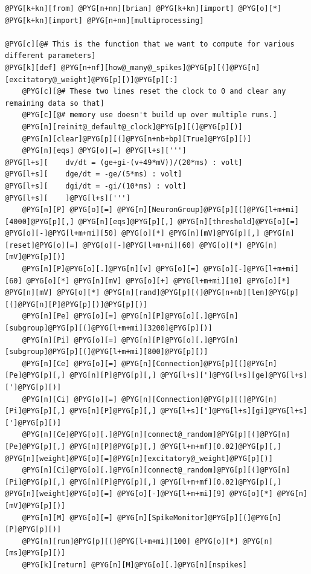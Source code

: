 \documentclass[letterpaper,10pt,english]{manual}
\begin{document}
\begin{Verbatim}[commandchars=@\[\]]
@PYG[k+kn][from] @PYG[n+nn][brian] @PYG[k+kn][import] @PYG[o][*]
@PYG[k+kn][import] @PYG[n+nn][multiprocessing]

@PYG[c][@# This is the function that we want to compute for various different parameters]
@PYG[k][def] @PYG[n+nf][how@_many@_spikes]@PYG[p][(]@PYG[n][excitatory@_weight]@PYG[p][)]@PYG[p][:]
    @PYG[c][@# These two lines reset the clock to 0 and clear any remaining data so that]
    @PYG[c][@# memory use doesn't build up over multiple runs.]
    @PYG[n][reinit@_default@_clock]@PYG[p][(]@PYG[p][)]
    @PYG[n][clear]@PYG[p][(]@PYG[n+nb+bp][True]@PYG[p][)]
    @PYG[n][eqs] @PYG[o][=] @PYG[l+s][''']
@PYG[l+s][    dv/dt = (ge+gi-(v+49*mV))/(20*ms) : volt]
@PYG[l+s][    dge/dt = -ge/(5*ms) : volt]
@PYG[l+s][    dgi/dt = -gi/(10*ms) : volt]
@PYG[l+s][    ]@PYG[l+s][''']
    @PYG[n][P] @PYG[o][=] @PYG[n][NeuronGroup]@PYG[p][(]@PYG[l+m+mi][4000]@PYG[p][,] @PYG[n][eqs]@PYG[p][,] @PYG[n][threshold]@PYG[o][=] @PYG[o][-]@PYG[l+m+mi][50] @PYG[o][*] @PYG[n][mV]@PYG[p][,] @PYG[n][reset]@PYG[o][=] @PYG[o][-]@PYG[l+m+mi][60] @PYG[o][*] @PYG[n][mV]@PYG[p][)]
    @PYG[n][P]@PYG[o][.]@PYG[n][v] @PYG[o][=] @PYG[o][-]@PYG[l+m+mi][60] @PYG[o][*] @PYG[n][mV] @PYG[o][+] @PYG[l+m+mi][10] @PYG[o][*] @PYG[n][mV] @PYG[o][*] @PYG[n][rand]@PYG[p][(]@PYG[n+nb][len]@PYG[p][(]@PYG[n][P]@PYG[p][)]@PYG[p][)]
    @PYG[n][Pe] @PYG[o][=] @PYG[n][P]@PYG[o][.]@PYG[n][subgroup]@PYG[p][(]@PYG[l+m+mi][3200]@PYG[p][)]
    @PYG[n][Pi] @PYG[o][=] @PYG[n][P]@PYG[o][.]@PYG[n][subgroup]@PYG[p][(]@PYG[l+m+mi][800]@PYG[p][)]
    @PYG[n][Ce] @PYG[o][=] @PYG[n][Connection]@PYG[p][(]@PYG[n][Pe]@PYG[p][,] @PYG[n][P]@PYG[p][,] @PYG[l+s][']@PYG[l+s][ge]@PYG[l+s][']@PYG[p][)]
    @PYG[n][Ci] @PYG[o][=] @PYG[n][Connection]@PYG[p][(]@PYG[n][Pi]@PYG[p][,] @PYG[n][P]@PYG[p][,] @PYG[l+s][']@PYG[l+s][gi]@PYG[l+s][']@PYG[p][)]
    @PYG[n][Ce]@PYG[o][.]@PYG[n][connect@_random]@PYG[p][(]@PYG[n][Pe]@PYG[p][,] @PYG[n][P]@PYG[p][,] @PYG[l+m+mf][0.02]@PYG[p][,] @PYG[n][weight]@PYG[o][=]@PYG[n][excitatory@_weight]@PYG[p][)]
    @PYG[n][Ci]@PYG[o][.]@PYG[n][connect@_random]@PYG[p][(]@PYG[n][Pi]@PYG[p][,] @PYG[n][P]@PYG[p][,] @PYG[l+m+mf][0.02]@PYG[p][,] @PYG[n][weight]@PYG[o][=] @PYG[o][-]@PYG[l+m+mi][9] @PYG[o][*] @PYG[n][mV]@PYG[p][)]
    @PYG[n][M] @PYG[o][=] @PYG[n][SpikeMonitor]@PYG[p][(]@PYG[n][P]@PYG[p][)]
    @PYG[n][run]@PYG[p][(]@PYG[l+m+mi][100] @PYG[o][*] @PYG[n][ms]@PYG[p][)]
    @PYG[k][return] @PYG[n][M]@PYG[o][.]@PYG[n][nspikes]


\end{Verbatim}
\end{document}
